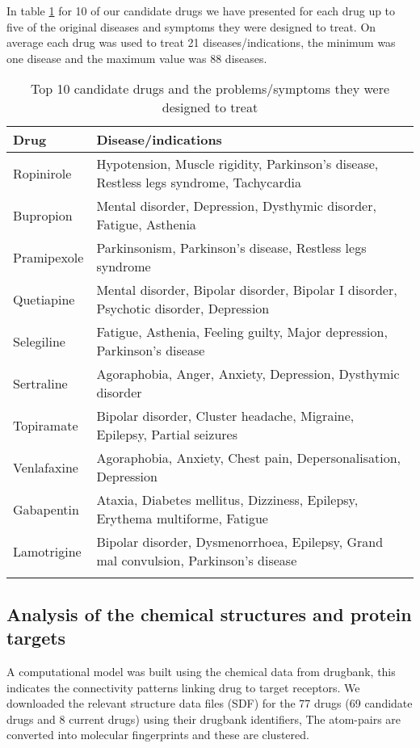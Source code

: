 \documentclass[preprint,12pt]{elsarticle}
\begin{document}
In table \ref{candidatetreats} for 10 of our candidate drugs we have presented for each drug up to five of the original diseases and symptoms they were designed to treat. On average each drug was used to treat 21 diseases/indications, the minimum was one disease and the maximum value was 88 diseases.

\begin{table}[h]
\scriptsize
  \centering \caption{Top 10 candidate drugs and the problems/symptoms they were designed to treat}\label{candidatetreats}
\centering
\begin{tabular}{ll}
  \hline
  Drug & Disease/indications \\ \hline
Ropinirole  & Hypotension, Muscle rigidity, Parkinson's disease, Restless legs syndrome, Tachycardia    \\
Bupropion  & Mental disorder, Depression, Dysthymic disorder, Fatigue, Asthenia\\        
Pramipexole & Parkinsonism, Parkinson's disease, Restless legs syndrome\\
Quetiapine & Mental disorder, Bipolar disorder, Bipolar I disorder,  Psychotic disorder, Depression\\
Selegiline   & Fatigue, Asthenia, Feeling guilty, Major depression, Parkinson's disease\\
Sertraline   & Agoraphobia, Anger, Anxiety, Depression, Dysthymic disorder\\    
Topiramate & Bipolar disorder, Cluster headache, Migraine, Epilepsy, Partial seizures\\
Venlafaxine & Agoraphobia, Anxiety, Chest pain, Depersonalisation, Depression   \\ 
Gabapentin & Ataxia, Diabetes mellitus, Dizziness, Epilepsy, Erythema multiforme, Fatigue  \\
Lamotrigine & Bipolar disorder, Dysmenorrhoea, Epilepsy, Grand mal convulsion, Parkinson's disease  \\
   \hline \normalsize
\end{tabular}
\end{table}

\subsection{Analysis of the chemical structures and protein targets}
A computational model was built using the chemical data from drugbank, this indicates the connectivity patterns linking drug to target receptors. We downloaded the relevant structure data files (SDF) for the 77 drugs (69 candidate drugs and 8 current drugs) using their drugbank identifiers, The atom-pairs are converted into molecular fingerprints and these are clustered. 
\end{document}
